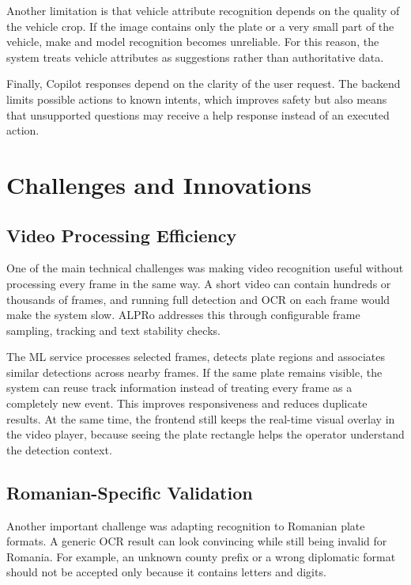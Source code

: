 ﻿\documentclass[12pt,a4paper]{article}
\begin{document}
Another limitation is that vehicle attribute recognition depends on the quality of the vehicle crop. If the image contains only the plate or a very small part of the vehicle, make and model recognition becomes unreliable. For this reason, the system treats vehicle attributes as suggestions rather than authoritative data.

Finally, Copilot responses depend on the clarity of the user request. The backend limits possible actions to known intents, which improves safety but also means that unsupported questions may receive a help response instead of an executed action.

\newpage
\section{Challenges and Innovations}

\subsection{Video Processing Efficiency}

One of the main technical challenges was making video recognition useful without processing every frame in the same way. A short video can contain hundreds or thousands of frames, and running full detection and OCR on each frame would make the system slow. ALPRo addresses this through configurable frame sampling, tracking and text stability checks.

The ML service processes selected frames, detects plate regions and associates similar detections across nearby frames. If the same plate remains visible, the system can reuse track information instead of treating every frame as a completely new event. This improves responsiveness and reduces duplicate results. At the same time, the frontend still keeps the real-time visual overlay in the video player, because seeing the plate rectangle helps the operator understand the detection context.

\subsection{Romanian-Specific Validation}

Another important challenge was adapting recognition to Romanian plate formats. A generic OCR result can look convincing while still being invalid for Romania. For example, an unknown county prefix or a wrong diplomatic format should not be accepted only because it contains letters and digits.
\end{document}
